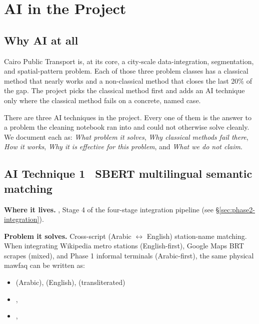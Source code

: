 
\section{AI in the Project}
\label{sec:ai}

\subsection{Why AI at all}

Cairo Public Transport is, at its core, a city-scale data-integration,
segmentation, and spatial-pattern problem. Each of those three problem
classes has a classical method that nearly works and a non-classical
method that closes the last 20\% of the gap. The project picks the
classical method first and adds an AI technique only where the
classical method fails on a concrete, named case.

There are three AI techniques in the project. Every one of them is the
answer to a problem the cleaning notebook ran into and could not
otherwise solve cleanly. We document each as: \emph{What problem it
solves}, \emph{Why classical methods fail there}, \emph{How it works},
\emph{Why it is effective for this problem}, and \emph{What we do not
claim}.

\subsection{AI Technique 1 \textbullet\ SBERT multilingual semantic matching}

\textbf{Where it lives.} , Stage 4 of the four-stage integration pipeline (see
\S\ref{sec:phase2-integration}).

\textbf{Problem it solves.} Cross-script (Arabic $\leftrightarrow$ English)
station-name matching. When integrating Wikipedia metro stations
(English-first), Google Maps BRT scrapes (mixed), and Phase 1
informal terminals (Arabic-first), the same physical mawfaq can be
written as:

\begin{itemize}
 \item {} (Arabic),  (English),  (transliterated)
 \item {}, 
 \item {}, 
\end{itemize}

